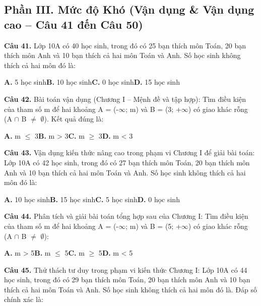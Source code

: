 \documentclass[11pt,a4paper]{article}
\begin{document}
\subsection*{\color{accent} Phần III. Mức độ Khó (Vận dụng \& Vận dụng cao -- Câu 41 đến Câu 50)}
\textbf{\color{primary} Câu 41.} Lớp 10A có 40 học sinh, trong đó có 25 bạn thích môn Toán, 20 bạn thích môn Anh và 10 bạn thích cả hai môn Toán và Anh. Số học sinh không thích cả hai môn đó là:\par
\hspace*{1.5em}\textbf{A.} 5 học sinh\quad\quad \textbf{B.} 10 học sinh\quad\quad \textbf{C.} 0 học sinh\quad\quad \textbf{D.} 15 học sinh\par\vspace{2pt}
\textbf{\color{primary} Câu 42.} Bài toán vận dụng (Chương I – Mệnh đề và tập hợp): Tìm điều kiện của tham số m để hai khoảng A = (-$\infty$; m) và B = (3; +$\infty$) có giao khác rỗng (A $\cap$ B $\ne$ $\emptyset$). Kết quả đúng là:\par
\hspace*{1.5em}\textbf{A.} m $\le$ 3\quad\quad \textbf{B.} m > 3\quad\quad \textbf{C.} m $\ge$ 3\quad\quad \textbf{D.} m < 3\par\vspace{2pt}
\textbf{\color{primary} Câu 43.} Vận dụng kiến thức nâng cao trong phạm vi Chương I để giải bài toán: Lớp 10A có 42 học sinh, trong đó có 27 bạn thích môn Toán, 20 bạn thích môn Anh và 10 bạn thích cả hai môn Toán và Anh. Số học sinh không thích cả hai môn đó là:\par
\hspace*{1.5em}\textbf{A.} 10 học sinh\quad\quad \textbf{B.} 15 học sinh\quad\quad \textbf{C.} 5 học sinh\quad\quad \textbf{D.} 0 học sinh\par\vspace{2pt}
\textbf{\color{primary} Câu 44.} Phân tích và giải bài toán tổng hợp sau của Chương I: Tìm điều kiện của tham số m để hai khoảng A = (-$\infty$; m) và B = (5; +$\infty$) có giao khác rỗng (A $\cap$ B $\ne$ $\emptyset$):\par
\hspace*{1.5em}\textbf{A.} m > 5\quad\quad \textbf{B.} m $\le$ 5\quad\quad \textbf{C.} m $\ge$ 5\quad\quad \textbf{D.} m < 5\par\vspace{2pt}
\textbf{\color{primary} Câu 45.} Thử thách tư duy trong phạm vi kiến thức Chương I: Lớp 10A có 44 học sinh, trong đó có 29 bạn thích môn Toán, 20 bạn thích môn Anh và 10 bạn thích cả hai môn Toán và Anh. Số học sinh không thích cả hai môn đó là. Đáp số chính xác là:\par
\end{document}
